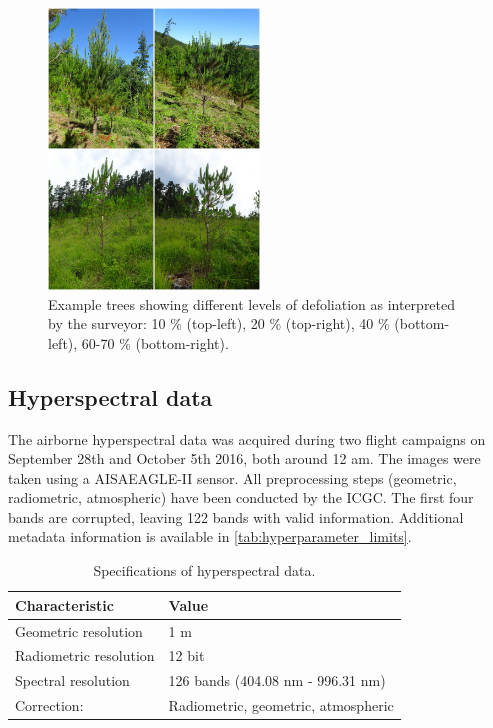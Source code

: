 \documentclass[letterpaper, journal]{IEEEtran}
\begin{document}
\begin{figure} [t!]
	\begin{center}
		\includegraphics[width=0.5\textwidth] {defol-grid-3000px.jpg}
        \caption{Example trees showing different levels of defoliation as interpreted by the surveyor: 10 \% (top-left), 20 \% (top-right), 40 \% (bottom-left), 60-70 \% (bottom-right).}
		\label{fig:defol-trees}
	\end{center}
\end{figure}

\subsection{Hyperspectral data}

\noindent The airborne hyperspectral data was acquired during two flight campaigns on September 28th and October 5th 2016, both around 12 am.
The images were taken using a AISAEAGLE-II sensor.
All preprocessing steps (geometric, radiometric, atmospheric) have been conducted by the \ac{ICGC}.
The first four bands are corrupted, leaving 122 bands with valid information.
Additional metadata information is available in \autoref{tab:hyperparameter_limits}.


\begin{table}[t]
\centering
\caption[t]{Specifications of hyperspectral data.}
\begingroup
\begin{tabular}{ll}
	\\
	Characteristic         & Value                               \\
	\hline
	Geometric resolution   & 1 m                                 \\
	Radiometric resolution & 12 bit                              \\
	Spectral resolution    & 126 bands (404.08 nm - 996.31 nm)   \\
	Correction:            & Radiometric, geometric, atmospheric
\end{tabular}
\endgroup
\label{tab:hyperparameter_limits}
\end{table}
\end{document}
